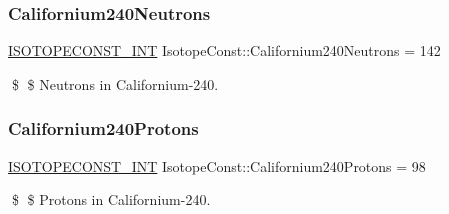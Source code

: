 \subsubsection{\texorpdfstring{Californium240\+Neutrons}{Californium240Neutrons}}
{\footnotesize\ttfamily \mbox{\hyperlink{group___isotope_const-_macros_ga5f18360b3e99483a35c32d789e62621c}{I\+S\+O\+T\+O\+P\+E\+C\+O\+N\+S\+T\+\_\+\+I\+NT}} Isotope\+Const\+::\+Californium240\+Neutrons = 142}

\$ \$ Neutrons in Californium-\/240. \mbox{\label{group___isotope_const-_californium-_cf240_ga8d510fe42c47660cd961e486d42815f9}} 
\subsubsection{\texorpdfstring{Californium240\+Protons}{Californium240Protons}}
{\footnotesize\ttfamily \mbox{\hyperlink{group___isotope_const-_macros_ga5f18360b3e99483a35c32d789e62621c}{I\+S\+O\+T\+O\+P\+E\+C\+O\+N\+S\+T\+\_\+\+I\+NT}} Isotope\+Const\+::\+Californium240\+Protons = 98}

\$ \$ Protons in Californium-\/240. 